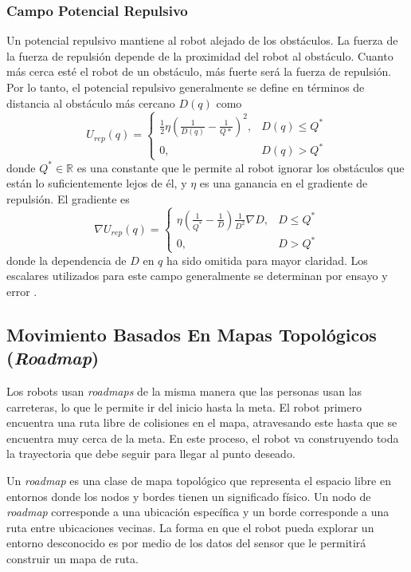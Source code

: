 \subsubsection{Campo Potencial Repulsivo}
Un potencial repulsivo mantiene al robot alejado de los obst\'aculos. La 
fuerza de la fuerza de repulsi\'on depende de la proximidad del robot al 
obst\'aculo. Cuanto m\'as cerca est\'e el robot de un obst\'aculo, m\'as 
fuerte ser\'a la fuerza de repulsi\'on. Por lo tanto, el potencial 
repulsivo generalmente se define en t\'erminos de distancia al obst\'aculo 
m\'as cercano $D(q)$ como 
\begin{equation}
U_{rep}(q) =
\begin{cases}
	\frac{1}{2}\eta(\frac{1}{D(q)} - \frac{1}{Q*})^2, & D(q)\leq Q^* \\
	0, & D(q) > Q^*
\end{cases}
\label{eq:pot_rep}
\end{equation}
donde $Q^* \in \mathbb R$ es una constante que le permite al robot ignorar 
los obst\'aculos que est\'an lo suficientemente lejos de \'el, y $\eta$ es 
una ganancia en el gradiente de repulsi\'on. El gradiente es 
\begin{equation}
\nabla U_{rep}(q) =
\begin{cases}
	\eta(\frac{1}{Q^*} - \frac{1}{D})\frac{1}{D^2} \nabla D, & D \leq Q^* \\
	0, & D > Q^*
\end{cases}
\label{eqn:gradient_rep}
\end{equation}
donde la dependencia de $D$ en $q$ ha sido omitida para mayor claridad. Los 
escalares utilizados para este campo generalmente se determinan por ensayo 
y error \cite{choset2005principles}.

\subsection{Movimiento Basados En Mapas Topol\'ogicos (\textit{Roadmap})}

Los robots usan \textit{roadmaps} de la misma manera que las personas usan 
las carreteras, lo que le permite ir del inicio hasta la meta. El robot 
primero encuentra una ruta libre de colisiones en el mapa, atravesando este 
hasta que se encuentra muy cerca de la meta. En este proceso, el robot va 
construyendo toda la trayectoria que debe seguir para llegar al punto deseado. 

Un \textit{roadmap} es una clase de mapa topol\'ogico que representa el 
espacio libre en entornos \cite{choset2005RoadMap} donde los nodos y bordes 
tienen un significado f\'isico. Un nodo de \textit{roadmap} corresponde a 
una ubicaci\'on espec\'ifica y un borde corresponde a una ruta entre ubicaciones 
vecinas. La forma en que el robot pueda explorar un entorno desconocido es por 
medio de los datos del sensor que le permitir\'a construir un mapa de ruta.

